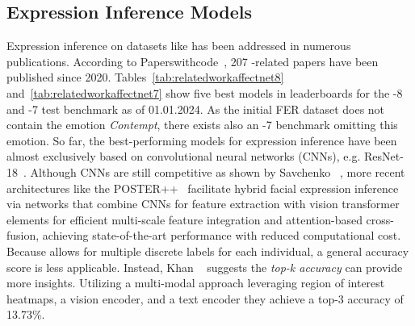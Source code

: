 \subsection{Expression Inference Models}

Expression inference on datasets like \affectnet{} has been addressed in numerous publications. 
According to Paperswithcode~\cite{paperswithcodeaff}, 207 \affectnet{}-related papers have been published since 2020. Tables~\ref{tab:relatedworkaffectnet8} and~\ref{tab:relatedworkaffectnet7} show five best models in leaderboards for the \affectnet{}-8 and \affectnet{}-7 test benchmark as of 01.01.2024. As the initial FER dataset does not contain the emotion \textit{Contempt}, there exists also an \affectnet{}-7 benchmark omitting this emotion. 
So far, the best-performing models for expression inference have been almost exclusively based on convolutional neural networks (CNNs), e.g. ResNet-18~\cite{he2016deep}. Although CNNs are still competitive as shown by Savchenko \etal~\cite{9815154}, more recent architectures like the POSTER++~\cite{mao2023poster} facilitate hybrid facial expression inference via networks that combine CNNs for feature extraction with vision transformer elements for efficient multi-scale feature integration and attention-based cross-fusion, achieving state-of-the-art performance with reduced computational cost.
Because \emotic{} allows for multiple discrete labels for each individual, a general accuracy score is less applicable. Instead, Khan \etal~\cite{khan2024focusclip} suggests the \textit{top-k accuracy} can provide more insights. Utilizing a multi-modal approach leveraging region of interest heatmaps, a vision encoder, and a text encoder they achieve a top-3 accuracy of 13.73\%. 
